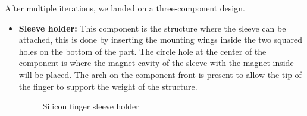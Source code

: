 After multiple iterations, we landed on a three-component design.
\begin{itemize}
    \item \textbf{Sleeve holder: } This component is the structure where the sleeve can be attached, this is done by inserting the mounting wings inside the two squared holes on the bottom of the part.
    The circle hole at the center of the component is where the magnet cavity of the sleeve with the magnet inside will be placed.
    The arch on the component front is present to allow the tip of the finger to support the weight of the structure.
    \begin{figure}
        \centering
        \caption{Silicon finger sleeve holder}
        \label{fig: sleeve_holder}
    \end{figure}


\end{itemize}
